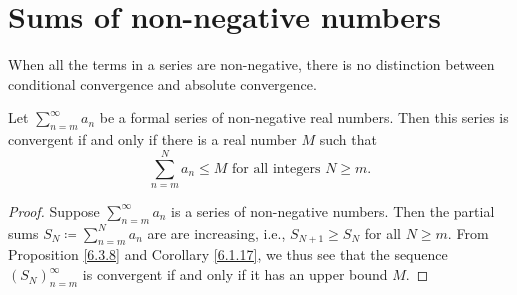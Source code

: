 \section{Sums of non-negative numbers}\label{sec 7.3}

\begin{note}
When all the terms in a series are non-negative, there is no distinction between conditional convergence and absolute convergence.
\end{note}

\begin{proposition}\label{7.3.1}
Let \(\sum_{n = m}^\infty a_n\) be a formal series of non-negative real numbers.
Then this series is convergent if and only if there is a real number \(M\) such that
\[
    \sum_{n = m}^N a_n \leq M \text{ for all integers } N \geq m.
\]
\end{proposition}

\begin{proof}
Suppose \(\sum_{n = m}^\infty a_n\) is a series of non-negative numbers.
Then the partial sums \(S_N \coloneqq \sum_{n = m}^N a_n\) are are increasing, i.e., \(S_{N + 1} \geq S_N\) for all \(N \geq m\).
From Proposition \ref{6.3.8} and Corollary \ref{6.1.17}, we thus see that the sequence \((S_N)_{n = m}^\infty\) is convergent if and only if it has an upper bound \(M\).
\end{proof}
